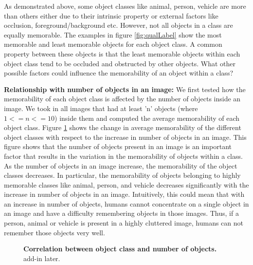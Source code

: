 As demonstrated above, some object classes like animal, person, vehicle are more than others either due to their intrinsic property or external factors like occlusion, foreground/background etc. However, not all objects in a class are equally memorable. The examples in figure \ref{fig:qualLabel} show the most memorable and least memorable objects for each object class. A common property between these objects is that the least memorable objects within each object class tend to be occluded and obstructed by other objects. What other possible factors could influence the memorability of an object within a class?

 

\textbf{Relationship with number of objects in an image:} We first tested how the memorability of each object class is affected by the number of objects inside an image. We took in all images that had at least 'n' objects (where $1 <= n <= 10$) inside them and computed the average memorability of each object class. Figure \ref{fig:obLabelChange} shows the change in average memorability of the different object classes with respect to the increase in number of objects in an image. This figure shows that the number of objects present in an image is an important factor that results in the variation in the memorability of objects within a class. As the number of objects in an image increase, the memorability of the object classes decreases. In particular, the memorability of objects belonging to highly memorable classes like animal, person, and vehicle decreases significantly with the increase in number of objects in an image. Intuitively, this could mean that with an increase in number of objects, humans cannot concentrate on a single object in an image and have a difficulty remembering objects in those images. Thus, if a person, animal or vehicle is present in a highly cluttered image, humans can not remember those objects very well.

\begin{figure}[t]
\centering
{}
\vspace{-5mm}\caption{\footnotesize\textbf{Correlation between object class and number of objects.} add-in later. }\label{fig:obLabelChange}
\end{figure}

